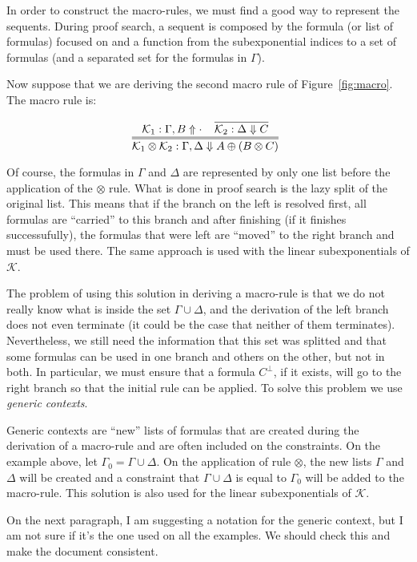 In order to construct the macro-rules, we must find a good way to represent the
sequents. During proof search, a sequent is composed by the formula (or list of formulas)
focused on and a function from the subexponential indices to a set of formulas
(and a separated set for the formulas in $\Gamma$).

Now suppose that we are deriving the second macro rule of
Figure~\ref{fig:macro}. The macro rule is:

$$
\infer=[]{\mathcal{K}_1 \otimes \mathcal{K}_2 : \Gamma, \Delta \Downarrow A \oplus (B \otimes C)}
{
  \mathcal{K}_1 : \Gamma, B \Uparrow \cdot \;\;\;\;
  \infer[]{\mathcal{K}_2 : \Delta \Downarrow C}{}
}
$$

Of course, the formulas in $\Gamma$ and $\Delta$ are represented by only one
list before the application of the $\otimes$ rule. What is done in proof search
is the lazy split of the original list. This means that if the branch on the
left is resolved first, all formulas are ``carried'' to this branch and after
finishing (if it finishes successufully), the formulas that were left are
``moved'' to the right branch and must be used there. The same approach is used
with the linear subexponentials of $\mathcal{K}$.

The problem of using this solution in deriving a macro-rule is that we do not
really know what is inside the set $\Gamma \cup \Delta$, and the derivation of
the left branch does not even terminate (it could be the case that neither of
them terminates). Nevertheless, we still need
the information that this set was splitted and that some formulas can be used in
one branch and others on the other, but not in both. In particular, we must
ensure that a formula $C^{\bot}$, if it exists, will go to the right branch so
that the initial rule can be applied. To solve this problem we
use \textit{generic contexts}.

Generic contexts are ``new'' lists of formulas that are created during the
derivation of a macro-rule and are often included on the constraints. On the
example above, let $\Gamma_0 = \Gamma \cup \Delta$. On the application of rule
$\otimes$, the new lists $\Gamma$ and $\Delta$ will be created and a constraint
that $\Gamma \cup \Delta$ is equal to $\Gamma_0$ will be added to the
macro-rule. This solution is also used for the linear subexponentials of
$\mathcal{K}$.

\begin{giselle}
On the next paragraph, I am suggesting a notation for the generic context, but I
am not sure if it's the one used on all the examples. We should check this and
make the document consistent.
\end{giselle}

